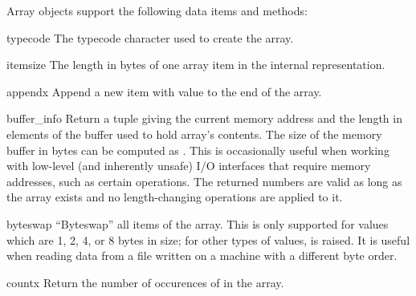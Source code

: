 Array objects support the following data items and methods:

\begin{memberdesc}[array]{typecode}
The typecode character used to create the array.
\end{memberdesc}

\begin{memberdesc}[array]{itemsize}
The length in bytes of one array item in the internal representation.
\end{memberdesc}


\begin{methoddesc}[array]{append}{x}
Append a new item with value  to the end of the array.
\end{methoddesc}

\begin{methoddesc}[array]{buffer_info}{}
Return a tuple  giving the current
memory address and the length in elements of the buffer used to hold
array's contents.  The size of the memory buffer in bytes can be
computed as .  This is occasionally useful when working with
low-level (and inherently unsafe) I/O interfaces that require memory
addresses, such as certain  operations.  The
returned numbers are valid as long as the array exists and no
length-changing operations are applied to it.

\end{methoddesc}

\begin{methoddesc}[array]{byteswap}{}
``Byteswap'' all items of the array.  This is only supported for
values which are 1, 2, 4, or 8 bytes in size; for other types of
values,  is raised.  It is useful when reading
data from a file written on a machine with a different byte order.
\end{methoddesc}

\begin{methoddesc}[array]{count}{x}
Return the number of occurences of  in the array.
\end{methoddesc}

